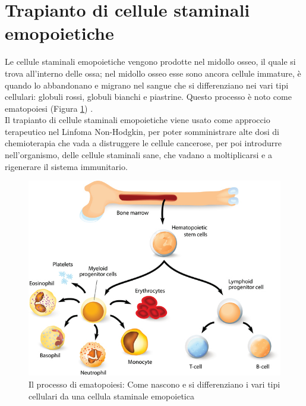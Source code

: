 \section{Trapianto di cellule staminali emopoietiche}

Le cellule staminali emopoietiche vengono prodotte nel midollo osseo, il quale si trova all’interno delle ossa; 
nel midollo osseo esse sono ancora cellule immature, è quando lo abbandonano e migrano nel sangue che si 
differenziano nei vari tipi cellulari: globuli rossi, globuli bianchi e piastrine. 
Questo processo è noto come ematopoiesi (Figura \ref{fig:FIGURE_3.14}) \cite{TRAPIANTO}.\\
Il trapianto di cellule staminali emopoietiche viene usato come approccio terapeutico nel Linfoma Non-Hodgkin, per 
poter somministrare alte dosi di chemioterapia che vada a distruggere le cellule cancerose, per poi introdurre 
nell’organismo, delle cellule staminali sane, che vadano a moltiplicarsi e a rigenerare il sistema immunitario.

\begin{figure}[H]
    \begin{center}
    \includegraphics[width=0.5\columnwidth]{img/transplant.jpeg}
    \vspace{-3mm}
    \end{center}
    \caption{Il processo di ematopoiesi: Come nascono e si differenziano i 
    vari tipi cellulari da una cellula staminale emopoietica
    \cite{img35}}
    \label{fig:FIGURE_3.14}
\end{figure}

